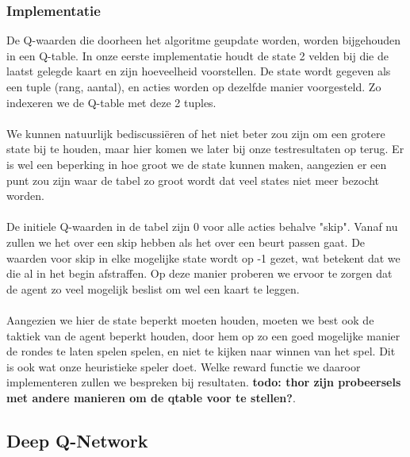 \documentclass[11pt]{article}
\begin{document}
\subsubsection{Implementatie}
De Q-waarden die doorheen het algoritme geupdate worden, worden bijgehouden in een Q-table. In onze eerste implementatie houdt de state 2 velden bij die de laatst gelegde kaart en zijn hoeveelheid voorstellen. De state wordt gegeven als een tuple (rang, aantal), en acties worden op dezelfde manier voorgesteld. Zo indexeren we de Q-table met deze 2 tuples. \\\\
We kunnen natuurlijk bediscussiëren of het niet beter zou zijn om een grotere state bij te houden, maar hier komen we later bij onze testresultaten op terug. Er is wel een beperking in hoe groot we de state kunnen maken, aangezien er een punt zou zijn waar de tabel zo groot wordt dat veel states niet meer bezocht worden. \\\\
De initiele Q-waarden in de tabel zijn 0 voor alle acties behalve "skip". Vanaf nu zullen we het over een skip hebben als het over een beurt passen gaat. De waarden voor skip in elke mogelijke state wordt op -1 gezet, wat betekent dat we die al in het begin afstraffen. Op deze manier proberen we ervoor te zorgen dat de agent zo veel mogelijk beslist om wel een kaart te leggen. \\\\
Aangezien we hier de state beperkt moeten houden, moeten we best ook de taktiek van de agent beperkt houden, door hem op zo een goed mogelijke manier de rondes te laten spelen spelen, en niet te kijken naar winnen van het spel. Dit is ook wat onze heuristieke speler doet. Welke reward functie we daaroor implementeren zullen we bespreken bij resultaten. \textbf{todo: thor zijn probeersels met andere manieren om de qtable voor te stellen?}.

\subsection{Deep Q-Network}
\end{document}
